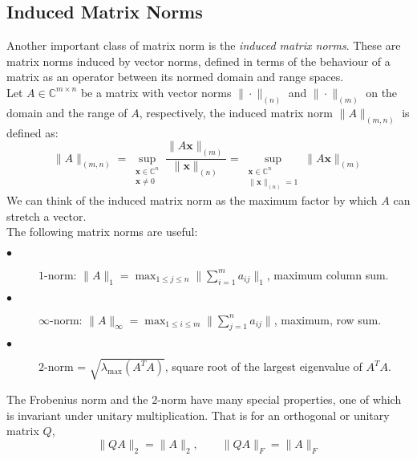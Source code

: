 \subsection{Induced Matrix Norms}
Another important class of matrix norm is the \textit{induced matrix norms}. These are matrix norms induced by vector norms, defined in terms of the behaviour of a matrix as an operator between its normed domain and range spaces.\\
Let $A \in \mathbb{C}^{m \times n}$ be a matrix with vector norms $\| \cdot \|_{(n)}$ and $\| \cdot \|_{(m)}$ on the domain and the range of $A$, respectively, the induced matrix norm $\| A \|_{(m, n)}$ is defined as:
\begin{equation}
	 \| A \|_{(m, n)} = \sup_{ \substack{\mathbf{x} \in \mathbb{C}^n \\ \mathbf{x} \neq 0}} \frac{\| A\mathbf{x} \|_{(m)}}{\| \mathbf{x} \|_{(n)}} = \sup_{\substack{\mathbf{x} \in \mathbb{C}^n \\\|\mathbf{x}\|_{(n)} = 1}} \|A\mathbf{x}\|_{(m)}
\end{equation}
We can think of the induced matrix norm as the maximum factor by which $A$ can stretch a vector.\\
The following matrix norms are useful:
\begin{description}
	\item[$\bullet$] $1$-norm: $\|A\|_1 = \max_{1\leq j\leq n} \| \sum_{i=1}^{m} a_{ij}\|_1$, maximum column sum.
	\item[$\bullet$] $\infty$-norm: $\|A\|_\infty = \max_{1\leq i\leq m} \|\sum_{j=1}^{n} a_{ij}\|$, maximum, row sum.
	\item[$\bullet$] $2$-norm = $\sqrt{\lambda_{\max}(A^{T}A)}$, square root of the largest eigenvalue of $A^TA.$
\end{description}
The Frobenius norm and the $2$-norm have many special properties, one of which is invariant under unitary multiplication. That is for an orthogonal or unitary matrix $Q$,
\begin{equation}
	\|QA\|_2 = \|A\|_2, \qquad \|QA\|_F = \|A\|_F
\end{equation}

